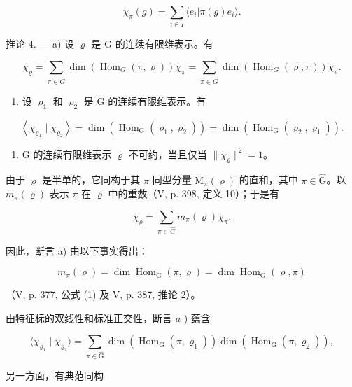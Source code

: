 \[
\chi_ {\pi} (g) = \sum_ {i \in I} \langle e _ {i} | \pi (g) e _ {i} \rangle .
\]

推论 4. --- a) 设 \(\varrho\) 是 G 的连续有限维表示。有

\[
\chi_ {\varrho} = \sum_ {\pi \in \widehat {G}} \dim (\operatorname{Hom} _ {G} (\pi , \varrho)) \chi_ {\pi} = \sum_ {\pi \in \widehat {G}} \dim (\operatorname{Hom} _ {G} (\varrho , \pi)) \chi_ {\pi}.
\]

\begin{enumerate}
\def\labelenumi{\alph{enumi})}
\setcounter{enumi}{1}
\tightlist
\item
  设 \(\varrho_{1}\) 和 \(\varrho_{2}\) 是 G 的连续有限维表示。有
\end{enumerate}

\[
\left\langle \chi_ {\varrho_ {1}} \mid \chi_ {\varrho_ {2}} \right\rangle = \dim (\operatorname{Hom} _ {\mathrm{G}} (\varrho_ {1}, \varrho_ {2})) = \dim (\operatorname{Hom} _ {\mathrm{G}} (\varrho_ {2}, \varrho_ {1})).
\]

\begin{enumerate}
\def\labelenumi{\alph{enumi})}
\setcounter{enumi}{2}
\tightlist
\item
  G 的连续有限维表示 \(\varrho\) 不可约，当且仅当 \(\| \chi_{\varrho}\|^{2} = 1\)。
\end{enumerate}

由于 \(\varrho\) 是半单的，它同构于其 \(\pi\)-同型分量 \(\mathrm{M}_{\pi}(\varrho)\) 的直和，其中 \(\pi \in \widehat{\mathrm{G}}\)。以 \(m_{\pi}(\varrho)\) 表示 \(\pi\) 在 \(\varrho\) 中的重数（V, p. 398, 定义 10）；于是有

\[
\chi_ {\varrho} = \sum_ {\pi \in \widehat {G}} m _ {\pi} (\varrho) \chi_ {\pi}.
\]

因此，断言 a) 由以下事实得出：

\[
m _ {\pi} (\varrho) = \dim \operatorname{Hom} _ {\mathrm{G}} (\pi , \varrho) = \dim \operatorname{Hom} _ {\mathrm{G}} (\varrho , \pi)
\]

（V, p. 377, 公式 (1) 及 V, p. 387, 推论 2）。

由特征标的双线性和标准正交性，断言 \(a\) ) 蕴含

\[
\langle \chi_ {\varrho_ {1}} \mid \chi_ {\varrho_ {2}} \rangle = \sum_ {\pi \in \widehat {\mathrm{G}}} \dim (\operatorname{Hom} _ {\mathrm{G}} (\pi , \varrho_ {1})) \dim (\operatorname{Hom} _ {\mathrm{G}} (\pi , \varrho_ {2})),
\]

另一方面，有典范同构

